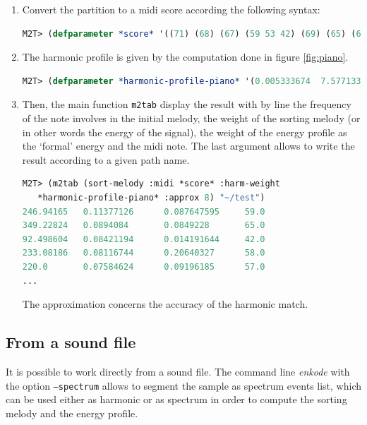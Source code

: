 \begin{enumerate}
\item 
Convert the partition to a midi score according the following syntax:
\begin{lstlisting}[language=Lisp]
M2T> (defparameter *score* '((71) (68) (67) (59 53 42) (69) (65) (65) (61 57 46) (64) (60 64) (58) (67 59 50 42) (54) (57) (58) (59)))
\end{lstlisting}

\item
The harmonic profile is given by the computation done in figure \ref{fig:piano}.

\begin{lstlisting}[language=Lisp]
M2T> (defparameter *harmonic-profile-piano* '(0.005333674  7.5771334e-4  0.0011644672 1.3338796e-4 7.3244237e-6  7.2097446e-6  2.3828345e-6  4.374403e-6 4.064216e-6  1.18368014e-4  4.6414575e-6  5.292382e-6 2.4746847e-5))
\end{lstlisting}

\item
Then, the main function \texttt{m2tab} display the result with by line the frequency of the note involves in the initial melody, the weight of the sorting melody (or in other words the energy of the signal), the weight of the energy profile as the `formal' energy and the midi note. The last argument allows to write the result according to a given path name.   

\begin{lstlisting}[language=Lisp]
M2T> (m2tab (sort-melody :midi *score* :harm-weight
   *harmonic-profile-piano* :approx 8) "~/test")
246.94165   0.11377126      0.087647595     59.0
349.22824   0.0894084       0.0849228       65.0
92.498604   0.08421194      0.014191644     42.0
233.08186   0.08116744      0.20640327      58.0
220.0       0.07584624      0.09196185      57.0
...
\end{lstlisting}

The approximation concerns the accuracy of the harmonic match.
\end{enumerate}

\subsection{From a sound file}

It is possible to work directly from a sound file. The command line \textsl{enkode} with the option \texttt{--spectrum} allows to segment the sample as spectrum events list, which can be used either as harmonic or as spectrum in order to compute the sorting melody and the energy profile. 

